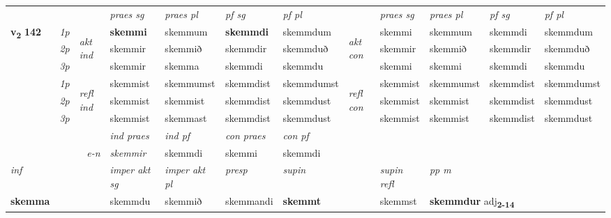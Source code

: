 \begin{longtable}[l]{X>{\footnotesize\itshape}llXXXXlXXXX}
 & &   & \textit{praes sg}  & \textit{praes pl}    & \textit{ pf sg} & \textit{pf pl} & & \textit{praes sg}  & \textit{praes pl}    & \textit{pf sg} & \textit{pf pl }  \\ \cmidrule{4-7} \cmidrule{9-12}
 \multirow{2}{*}{{{\textbf{v{\textsubscript{2}}} \Large{\textbf{142}}}}}  & 1p & \multirow{3}{*}{\begin{turn}{90}\textit{akt ind}\end{turn}} & \textbf{skemmi} & skemmum & \textbf{skemmdi} & skemmdum & \multirow{3}{*}{\begin{turn}{90}\textit{akt con}\end{turn}} &skemmi & skemmum & skemmdi & skemmdum\\*
 & 2p &  &  skemmir  & skemmið & skemmdir & skemmduð & & skemmir & skemmið & skemmdir & skemmduð \\*
 & 3p &  & skemmir & skemma & skemmdi & skemmdu & & skemmi & skemmi& skemmdi & skemmdu \\*
\cmidrule{4-7} \cmidrule{9-12}
 & 1p & \multirow{3}{*}{\begin{turn}{90}\textit{refl ind}\end{turn}}  & skemmist & skemmumst & skemmdist & skemmdumst & \multirow{3}{*}{\begin{turn}{90}\textit{refl con}\end{turn}}  &skemmist & skemmumst & skemmdist & skemmdumst \\*
 & 2p &  & skemmist & skemmist & skemmdist & skemmdust & &skemmist & skemmist & skemmdist & skemmdust \\*
 & 3p  & & skemmist & skemmast & skemmdist & skemmdust & & skemmist & skemmist& skemmdist & skemmdust \\*
\cmidrule{4-7} \cmidrule{9-12}

   && &  \textit{ind praes} & \textit{ind pf} & \textit{con praes} & \textit{con pf} \\*
\multicolumn{3}{r}{\textit{e-n}} & skemmir & skemmdi & skemmi & skemmdi \\*

\cmidrule{4-7}
   {\textit{inf}} & &  & \textit{imper akt sg} & \textit{imper akt pl}   & \textit{presp} & \textit{supin} && \textit{supin refl} & \textit{pp m} \\*
  {\textbf{skemma}} & && skemmdu  & skemmið   & skemmandi &  \textbf{skemmt} && skemmst & \multicolumn{2}{l}{\textbf{skemmdur} adj\textbf{\textsubscript{2-14}}} \\*

\midrule


\end{longtable}

